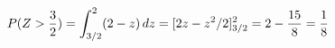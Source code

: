 \documentclass[preview]{standalone}
\begin{document}
\begin{align*}
\special{dvisvgm:raw <g id='unique000'>}P(Z>\frac32)=\int_{3/2}^2(2-z)\,dz=[2z-z^2/2]_{3/2}^2=2-\frac{15}{8}=\frac18\special{dvisvgm:raw </g>}
\end{align*}
\end{document}
